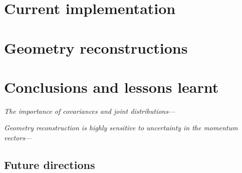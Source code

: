 \section{Current implementation}

\section{Geometry reconstructions}

\section{Conclusions and lessons learnt}
\emph{The importance of covariances and joint distributions}---

\emph{Geometry reconstruction is highly sensitive to uncertainty in the momentum vectors}---

\subsection{Future directions}

